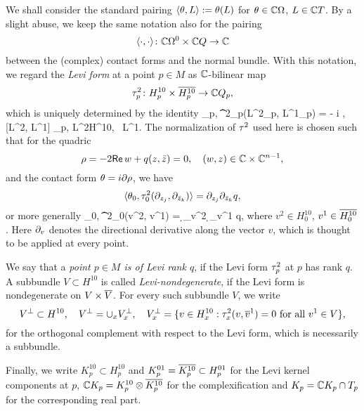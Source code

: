 \documentclass[12pt]{amsart}
\begin{document}
We shall consider the standard pairing $\langle \theta, L\rangle := \theta(L)$
for $\theta\in {\mathbb{C}}\Omega$, $L\in {\mathbb{C}} T$.
By a slight abuse, we keep the same notation also for the pairing
$$
	\langle \cdot, \cdot \rangle \colon {\mathbb{C}}\Omega^0 \times {\mathbb{C}} Q \to {\mathbb{C}}
$$
between the (complex) contact forms and the normal bundle.
With this notation, we regard the {\em Levi form} at a point $p\in M$ 
as  ${\mathbb{C}}$-bilinear map
$$
	\tau^2_p \colon H^{10}_p \times \overline{H^{10}_p} \to {\mathbb{C}} Q_p,
$$
which
is uniquely determined by the identity
\beq{}
	\la \th_p, \t^2_p(L^2_p, L^1_p) \ra = - i \la \th, [L^2, L^1] \ra_p,
	\quad 
	L^2\in H^{10}, \, L^1\in {}.
\eeq
The normalization of $\tau^2$ used here is chosen
such that for the quadric
$$
	\rho = -2{\sf Re}\, w + q(z,{\bar z}) =0,
	\quad
	(w,z)\in {\mathbb{C}}\times {\mathbb{C}}^{n-1},
$$ 
and the contact form $\theta = i\partial \rho$,
we have
$$
	\langle \theta_0,  \tau^2_0(\partial_{z_j}, \partial_{{\bar z}_k}) \rangle = \partial_{z_j} \partial_{{\bar z}_k} q,
$$
or more generally
\beq{}
	\la \th_0,  \t^2_0(v^2, v^1) \ra = \d_{v^2} \d_{v^1} q,
\eeq
where $v^2 \in H^{10}_0$, $v^1\in \overline{H^{10}_0}$.
Here $\partial_v$ denotes the directional derivative 
along the vector $v$, which is thought to be applied at every point.


We say that a {\em point $p\in M$ is of Levi rank $q$},
if the Levi form $\tau^2_p$ at $p$ has rank $q$.
A subbundle $V\subset H^{10}$
is called {\em Levi-nondegenerate},
if the Levi form is nondegenerate on $V\times \overline{V}$. 
For every such subbundle $V$,
we write 
$$
	V^\perp \subset H^{10},
	\quad
	V^\perp = \cup_x V_x^\perp,
	\quad
	V_x^\perp = \{ v\in H^{10}_x : \tau^2_x(v, \overline{v}^1) =0 \text{ for all } v^1\in V\},
$$
for the orthogonal complement with respect to the Levi form,
which is necessarily a subbundle.

Finally, we write $K^{10}_p\subset H^{10}_p$
and $K^{01}_p = \overline{K^{10}_p}\subset H^{01}_p$
for the Levi kernel components at $p$, 
${\mathbb{C}} K_p= K^{10}_p \otimes \overline{K^{10}_p}$
for the complexification and
$K_p = {\mathbb{C}} K_p \cap T_p$
for the corresponding real part.
\end{document}
